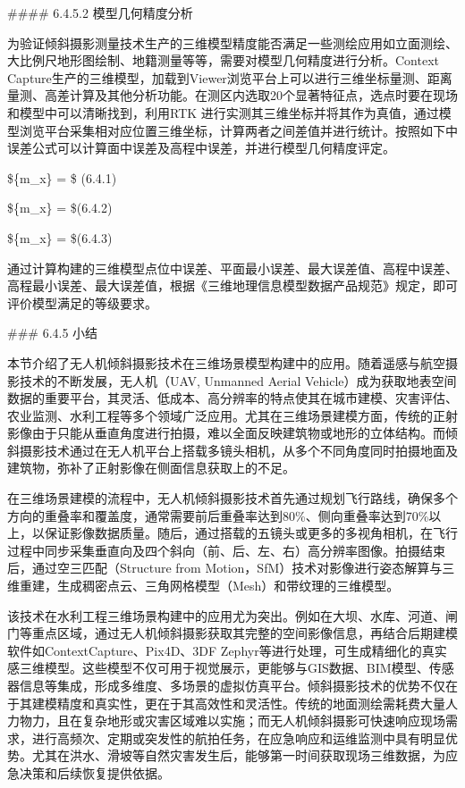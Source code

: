 \#\#\#\# 6.4.5.2 模型几何精度分析

为验证倾斜摄影测量技术生产的三维模型精度能否满足一些测绘应用如立面测绘、大比例尺地形图绘制、地籍测量等等，需要对模型几何精度进行分析。Context Capture生产的三维模型，加载到Viewer浏览平台上可以进行三维坐标量测、距离量测、高差计算及其他分析功能。在测区内选取20个显著特征点，选点时要在现场和模型中可以清晰找到，利用RTK 进行实测其三维坐标并将其作为真值，通过模型浏览平台采集相对应位置三维坐标，计算两者之间差值并进行统计。按照如下中误差公式可以计算面中误差及高程中误差，并进行模型几何精度评定。

\$\{m\_x\} =  \$ (6.4.1)

\$\{m\_x\} =  \$(6.4.2)

\$\{m\_x\} =  \$(6.4.3)

通过计算构建的三维模型点位中误差、平面最小误差、最大误差值、高程中误差、高程最小误差、最大误差值，根据《三维地理信息模型数据产品规范》规定，即可评价模型满足的等级要求。

\#\#\# 6.4.5 小结

本节介绍了无人机倾斜摄影技术在三维场景模型构建中的应用。随着遥感与航空摄影技术的不断发展，无人机（UAV, Unmanned Aerial Vehicle）成为获取地表空间数据的重要平台，其灵活、低成本、高分辨率的特点使其在城市建模、灾害评估、农业监测、水利工程等多个领域广泛应用。尤其在三维场景建模方面，传统的正射影像由于只能从垂直角度进行拍摄，难以全面反映建筑物或地形的立体结构。而倾斜摄影技术通过在无人机平台上搭载多镜头相机，从多个不同角度同时拍摄地面及建筑物，弥补了正射影像在侧面信息获取上的不足。

在三维场景建模的流程中，无人机倾斜摄影技术首先通过规划飞行路线，确保多个方向的重叠率和覆盖度，通常需要前后重叠率达到80\%、侧向重叠率达到70\%以上，以保证影像数据质量。随后，通过搭载的五镜头或更多的多视角相机，在飞行过程中同步采集垂直向及四个斜向（前、后、左、右）高分辨率图像。拍摄结束后，通过空三匹配（Structure from Motion，SfM）技术对影像进行姿态解算与三维重建，生成稠密点云、三角网格模型（Mesh）和带纹理的三维模型。

该技术在水利工程三维场景构建中的应用尤为突出。例如在大坝、水库、河道、闸门等重点区域，通过无人机倾斜摄影获取其完整的空间影像信息，再结合后期建模软件如ContextCapture、Pix4D、3DF Zephyr等进行处理，可生成精细化的真实感三维模型。这些模型不仅可用于视觉展示，更能够与GIS数据、BIM模型、传感器信息等集成，形成多维度、多场景的虚拟仿真平台。倾斜摄影技术的优势不仅在于其建模精度和真实性，更在于其高效性和灵活性。传统的地面测绘需耗费大量人力物力，且在复杂地形或灾害区域难以实施；而无人机倾斜摄影可快速响应现场需求，进行高频次、定期或突发性的航拍任务，在应急响应和运维监测中具有明显优势。尤其在洪水、滑坡等自然灾害发生后，能够第一时间获取现场三维数据，为应急决策和后续恢复提供依据。

